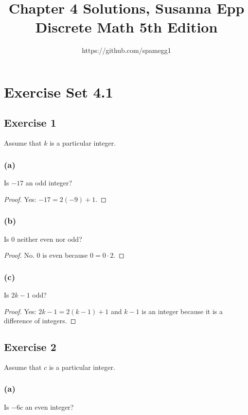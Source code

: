 \documentclass[14pt]{extarticle}
\title{Chapter 4 Solutions, Susanna Epp Discrete Math 5th Edition}
\author{https://github.com/spamegg1}
\begin{document}
\maketitle
\tableofcontents

\section{Exercise Set 4.1}

\subsection{Exercise 1}
Assume that $k$ is a particular integer.

\subsubsection{(a)}
Is $-17$ an odd integer?

\begin{proof}
    Yes: $-17 = 2(-9) + 1$.

\end{proof}

\subsubsection{(b)}
Is 0 neither even nor odd?

\begin{proof}
    No. 0 is even because $0 = 0 \cdot 2$.
\end{proof}

\subsubsection{(c)}
Is $2k - 1$ odd?

\begin{proof}
    Yes: $2k - 1 = 2(k - 1) + 1$ and $k - 1$ is an integer because it is a difference of integers.
\end{proof}

\subsection{Exercise 2}
Assume that $c$ is a particular integer.

\subsubsection{(a)}
Is $-6c$ an even integer?
\end{document}
